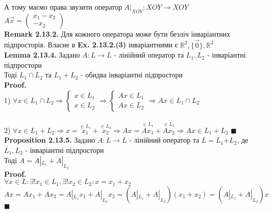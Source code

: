 \documentclass[a4paper, 14pt]{extarticle}
\def\rm#1{\textbf{Remark {#1}}}
\def\prp#1{\textbf{Proposition {#1}}}
\def\lm#1{\textbf{Lemma {#1}}}
\def\proof{\textbf{Proof.}\\}
\def\bigline{\vspace{5mm}\\}
\def\qed{$\blacksquare$}
\begin{document}
А тому маємо права звузити оператор $A|_{XOY}: XOY \to XOY$\\
$A \vec{x} = \begin{pmatrix}
x_1 - x_2 \\ -x_2
\end{pmatrix}$
\bigline
\rm{2.13.2.} Для кожного оператора може бути безліч інваріантних підпросторів. Власне в \textbf{Ex. 2.13.2.(3)} інваріантними є $\mathbb{R}^2, \{\vec{0}\}, \mathbb{R}^3$
\bigline
\lm{2.13.4.} Задано $A: L \to L$ - лінійний оператор та $L_1, L_2$ - інваріантні підпростори\\
Тоді $L_1 \cap L_2$ та $L_1 + L_2$ - обидва інваріантні підпростори\\
\proof
1) $\forall x \in L_1 \cap L_2 \Rightarrow \begin{cases} x \in L_1 \\ x \in L_2 \end{cases} \Rightarrow \begin{cases} Ax \in L_1 \\ Ax \in L_2 \end{cases} \Rightarrow Ax \in L_1 \cap L_2$\\
\\
2) $\forall x \in L_1 + L_2 \Rightarrow x = \overset{\in L_1}{x_1} + \overset{\in L_2}{x_2} \Rightarrow Ax = \overset{\in L_1}{A x_1} + \overset{\in L_2}{A x_2} \Rightarrow Ax \in L_1+L_2$ \qed
\bigline
\prp{2.13.5.} Задано $A: L \to L$ - лінійний оператор та $L = L_1 \dot{+} L_2$, де $L_1,L_2$ - інваріантні підпростори\\
Тоді $A = A|_{L_1} + A|_{L_2}$\\
\proof
$\forall x \in L: \exists! x_1 \in L_1, \exists! x_2 \in L_2: x = x_1 + x_2$\\
$Ax = Ax_1 + Ax_2 = A|_{L_1}x_1 + A|_{L_2}x_2 = (A|_{L_1}+A|_{L_2})(x_1 + x_2) = (A|_{L_1}+A|_{L_2})x$ \qed
\bigline
\end{document}

